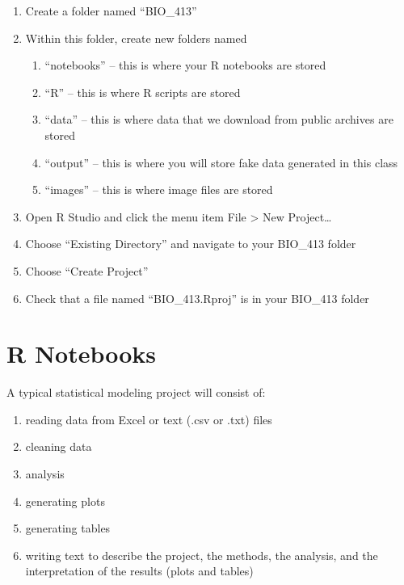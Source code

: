 \documentclass[]{book}
\providecommand{\tightlist}{%
  \setlength{\itemsep}{0pt}\setlength{\parskip}{0pt}}
\theoremstyle{definition}
\theoremstyle{definition}
\theoremstyle{definition}
\theoremstyle{remark}
\begin{document}
\begin{enumerate}
\def\labelenumi{\arabic{enumi}.}
\tightlist
\item
  Create a folder named ``BIO\_413''
\item
  Within this folder, create new folders named

  \begin{enumerate}
  \def\labelenumii{\arabic{enumii}.}
  \tightlist
  \item
    ``notebooks'' -- this is where your R notebooks are stored
  \item
    ``R'' -- this is where R scripts are stored
  \item
    ``data'' -- this is where data that we download from public archives
    are stored
  \item
    ``output'' -- this is where you will store fake data generated in
    this class
  \item
    ``images'' -- this is where image files are stored
  \end{enumerate}
\item
  Open R Studio and click the menu item File \textgreater{} New
  Project\ldots{}
\item
  Choose ``Existing Directory'' and navigate to your BIO\_413 folder
\item
  Choose ``Create Project''
\item
  Check that a file named ``BIO\_413.Rproj'' is in your BIO\_413 folder
\end{enumerate}

\section{R Notebooks}\label{r-notebooks}

A typical statistical modeling project will consist of:

\begin{enumerate}
\def\labelenumi{\arabic{enumi}.}
\tightlist
\item
  reading data from Excel or text (.csv or .txt) files
\item
  cleaning data
\item
  analysis
\item
  generating plots
\item
  generating tables
\item
  writing text to describe the project, the methods, the analysis, and
  the interpretation of the results (plots and tables)
\end{enumerate}
\end{document}

